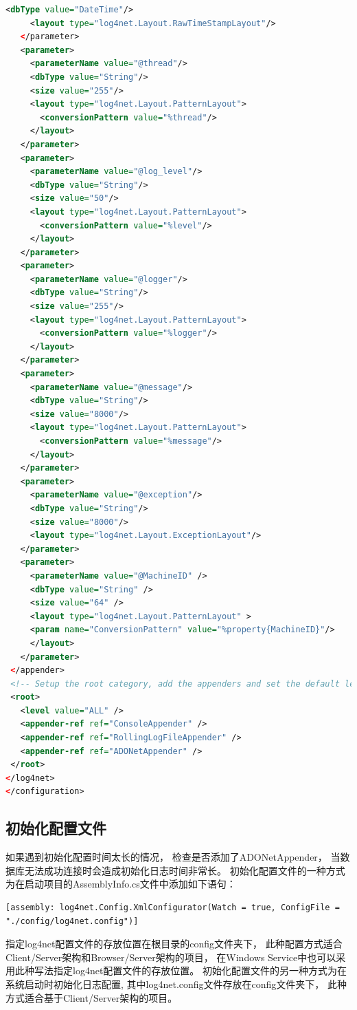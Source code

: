 \documentclass{book}
\begin{document}
\begin{lstlisting}[language=XML]
     <dbType value="DateTime"/>
     <layout type="log4net.Layout.RawTimeStampLayout"/>
   </parameter>
   <parameter>
     <parameterName value="@thread"/>
     <dbType value="String"/>
     <size value="255"/>
     <layout type="log4net.Layout.PatternLayout">
       <conversionPattern value="%thread"/>
     </layout>
   </parameter>
   <parameter>
     <parameterName value="@log_level"/>
     <dbType value="String"/>
     <size value="50"/>
     <layout type="log4net.Layout.PatternLayout">
       <conversionPattern value="%level"/>
     </layout>
   </parameter>
   <parameter>
     <parameterName value="@logger"/>
     <dbType value="String"/>
     <size value="255"/>
     <layout type="log4net.Layout.PatternLayout">
       <conversionPattern value="%logger"/>
     </layout>
   </parameter>
   <parameter>
     <parameterName value="@message"/>
     <dbType value="String"/>
     <size value="8000"/>
     <layout type="log4net.Layout.PatternLayout">
       <conversionPattern value="%message"/>
     </layout>
   </parameter>
   <parameter>
     <parameterName value="@exception"/>
     <dbType value="String"/>
     <size value="8000"/>
     <layout type="log4net.Layout.ExceptionLayout"/>
   </parameter>
   <parameter>
	 <parameterName value="@MachineID" />
	 <dbType value="String" />
 	 <size value="64" />
	 <layout type="log4net.Layout.PatternLayout" >
	 <param name="ConversionPattern" value="%property{MachineID}"/>
	 </layout>
   </parameter>
 </appender>
 <!-- Setup the root category, add the appenders and set the default level -->
 <root>
   <level value="ALL" />
   <appender-ref ref="ConsoleAppender" />
   <appender-ref ref="RollingLogFileAppender" />
   <appender-ref ref="ADONetAppender" />
 </root>
</log4net>  
</configuration>\end{lstlisting}

\subsection{初始化配置文件}

如果遇到初始化配置时间太长的情况，
检查是否添加了ADONetAppender，
当数据库无法成功连接时会造成初始化日志时间非常长。
初始化配置文件的一种方式为在启动项目的AssemblyInfo.cs文件中添加如下语句：
\begin{lstlisting}[language={[Sharp]C}]
[assembly: log4net.Config.XmlConfigurator(Watch = true, ConfigFile = "./config/log4net.config")]
\end{lstlisting}
指定log4net配置文件的存放位置在根目录的config文件夹下，
此种配置方式适合Client/Server架构和Browser/Server架构的项目，
在Windows Service中也可以采用此种写法指定log4net配置文件的存放位置。
初始化配置文件的另一种方式为在系统启动时初始化日志配置,
其中log4net.config文件存放在config文件夹下，
此种方式适合基于Client/Server架构的项目。
\end{document}

